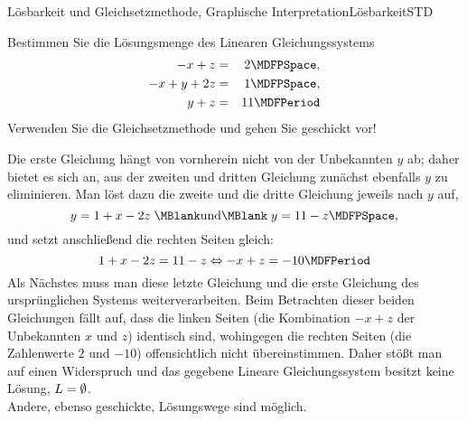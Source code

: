 \begin{MXContent}{Lösbarkeit und Gleichsetzmethode, Graphische Interpretation}{Lösbarkeit}{STD}
\begin{MExercise}
Bestimmen Sie die Lösungsmenge des Linearen Gleichungssystems
\begin{eqnarray*}
- x + z & = & 2 \MDFPSpace, \\ - x + y + 2 z & = & 1 \MDFPSpace, \\ y + z & = & 11 \MDFPeriod
\end{eqnarray*}
Verwenden Sie die Gleichsetzmethode und gehen Sie geschickt vor!

\begin{MHint}{\iSolution}
Die erste Gleichung hängt von vornherein nicht von der Unbekannten $y$ ab; daher bietet es sich an, aus der
zweiten und dritten Gleichung zunächst ebenfalls $y$ zu eliminieren. Man löst dazu die zweite und die dritte
Gleichung jeweils nach $y$ auf,
$$y = 1 + x - 2 z \; \MBlank\mbox{und}\MBlank \; y = 11 - z \MDFPSpace ,$$
und setzt anschließend die rechten Seiten gleich:
$$1 + x - 2 z = 11 - z \Leftrightarrow - x + z = - 10 \MDFPeriod $$
Als Nächstes muss man diese letzte Gleichung und die erste Gleichung des ursprünglichen Systems
weiterverarbeiten. Beim Betrachten dieser beiden Gleichungen fällt auf, dass die linken Seiten (die
Kombination $- x + z$ der Unbekannten $x$ und $z$) identisch sind, wohingegen die rechten Seiten
(die Zahlenwerte $2$ und $-10$) offensichtlich nicht übereinstimmen. Daher stößt man auf einen
Widerspruch und das gegebene Lineare Gleichungssystem besitzt keine Lösung, ${L} = \emptyset$.\\
Andere, ebenso geschickte, Lösungswege sind möglich.
\end{MHint}
\end{MExercise}
\end{MXContent}

